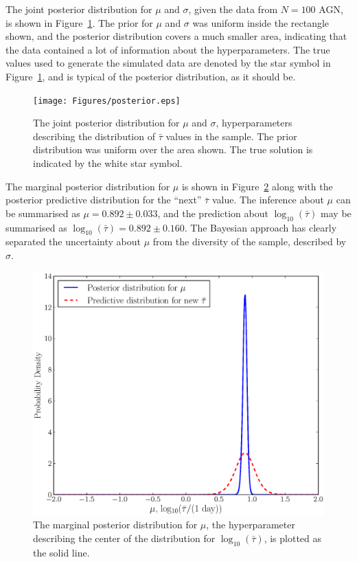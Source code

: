 \documentclass[useAMS,usenatbib]{mn2e}
\begin{document}
The joint posterior distribution for $\mu$ and
$\sigma$, given the data from $N=100$ AGN,
is shown in Figure~\ref{fig:posterior}. The prior for $\mu$ and $\sigma$
was uniform inside the rectangle shown, and the posterior distribution covers
a much smaller area, indicating that the data contained a lot of information
about the hyperparameters. The true values used to generate the simulated data
are denoted by the star symbol in Figure~\ref{fig:posterior},
and is typical of the posterior distribution, as it should be.

\begin{figure}
\begin{center}
\texttt{[image: Figures/posterior.eps]}
\caption{The joint posterior distribution for $\mu$ and $\sigma$, hyperparameters
describing the distribution of $\bar{\tau}$ values in the sample. The prior
distribution was uniform over the area shown.
The true solution is indicated by the white star symbol.\label{fig:posterior}}
\end{center}
\end{figure}

The marginal posterior distribution for $\mu$ is shown in Figure~\ref{fig:posterior2}
along with the posterior predictive distribution for the ``next'' $\bar{\tau}$ value. The inference about $\mu$ can be summarised as
$\mu = 0.892 \pm 0.033$, and the prediction about $\log_{10}(\bar{\tau})$
may be summarised as $\log_{10}(\bar{\tau}) = 0.892 \pm 0.160$. The Bayesian
approach has clearly separated the uncertainty about $\mu$ from the diversity of the
sample, described by $\sigma$.

\begin{figure}
\begin{center}
\includegraphics[scale=0.35]{Figures/posterior2.eps}
\caption{The marginal posterior distribution for $\mu$, the 
hyperparameter describing the center of the distribution for
$\log_{10}\left(\bar{\tau}\right)$, is plotted as the solid line.
\label{fig:posterior2}}
\end{center}
\end{figure}
\end{document}
